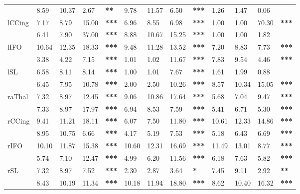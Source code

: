 \begin{tabular}{lllll|llll|llll}
\rowcolor[HTML]{C0C0C0}
\multicolumn{1}{l|}{\cellcolor[HTML]{C0C0C0}lArc} & 8.59 & 10.37 & 2.67 & \textbf{**} & 9.78 & 11.57 & 6.50 & \textbf{***} & 1.26 & 1.47 & 0.06 & \textbf{} \\
\multicolumn{1}{l|}{lCCing} & 7.17 & 8.79 & 15.00 & \textbf{***} & 6.96 & 8.55 & 6.98 & \textbf{***} & 1.00 & 1.00 & 70.30 & \textbf{***} \\
\rowcolor[HTML]{C0C0C0}
\multicolumn{1}{l|}{\cellcolor[HTML]{C0C0C0}lCS} & 6.41 & 7.90 & 37.00 & \textbf{***} & 8.88 & 10.67 & 15.25 & \textbf{***} & 1.00 & 1.00 & 1.82 & \textbf{} \\
\multicolumn{1}{l|}{lIFO} & 10.64 & 12.35 & 18.33 & \textbf{***} & 9.48 & 11.28 & 13.52 & \textbf{***} & 7.20 & 8.83 & 7.73 & \textbf{***} \\
\rowcolor[HTML]{C0C0C0}
\multicolumn{1}{l|}{\cellcolor[HTML]{C0C0C0}lIL} & 3.38 & 4.22 & 7.15 & \textbf{***} & 1.01 & 1.02 & 11.67 & \textbf{***} & 7.83 & 9.54 & 4.46 & \textbf{***} \\
\multicolumn{1}{l|}{lSL} & 6.58 & 8.11 & 8.14 & \textbf{***} & 1.00 & 1.01 & 7.67 & \textbf{***} & 1.61 & 1.99 & 0.88 & \textbf{} \\
\rowcolor[HTML]{C0C0C0}
\multicolumn{1}{l|}{\cellcolor[HTML]{C0C0C0}lUnc} & 6.45 & 7.95 & 10.78 & \textbf{***} & 2.00 & 2.50 & 10.26 & \textbf{***} & 8.57 & 10.34 & 15.05 & \textbf{***} \\
\multicolumn{1}{l|}{raThal} & 7.32 & 8.97 & 12.45 & \textbf{***} & 9.06 & 10.86 & 17.64 & \textbf{***} & 5.68 & 7.04 & 9.47 & \textbf{***} \\
\rowcolor[HTML]{C0C0C0}
\multicolumn{1}{l|}{\cellcolor[HTML]{C0C0C0}rArc} & 7.33 & 8.97 & 17.97 & \textbf{***} & 6.94 & 8.53 & 7.59 & \textbf{***} & 5.41 & 6.71 & 5.30 & \textbf{***} \\
\multicolumn{1}{l|}{rCCing} & 9.41 & 11.21 & 18.11 & \textbf{***} & 6.07 & 7.50 & 11.80 & \textbf{***} & 10.61 & 12.33 & 14.86 & \textbf{***} \\
\rowcolor[HTML]{C0C0C0}
\multicolumn{1}{l|}{\cellcolor[HTML]{C0C0C0}rCS} & 8.95 & 10.75 & 6.66 & \textbf{***} & 4.17 & 5.19 & 7.53 & \textbf{***} & 5.18 & 6.43 & 6.69 & \textbf{***} \\
\multicolumn{1}{l|}{rIFO} & 10.10 & 11.87 & 15.38 & \textbf{***} & 10.60 & 12.31 & 16.69 & \textbf{***} & 11.49 & 13.01 & 8.77 & \textbf{***} \\
\rowcolor[HTML]{C0C0C0}
\multicolumn{1}{l|}{\cellcolor[HTML]{C0C0C0}rIL} & 5.74 & 7.10 & 12.47 & \textbf{***} & 4.99 & 6.20 & 11.56 & \textbf{***} & 6.18 & 7.63 & 5.82 & \textbf{***} \\
\multicolumn{1}{l|}{rSL} & 7.32 & 8.97 & 7.52 & \textbf{***} & 2.30 & 2.87 & 3.64 & \textbf{*} & 7.45 & 9.11 & 2.92 & \textbf{**} \\
\rowcolor[HTML]{C0C0C0}
\multicolumn{1}{l|}{\cellcolor[HTML]{C0C0C0}rUnc} & 8.43 & 10.19 & 11.34 & \textbf{***} & 10.18 & 11.94 & 18.80 & \textbf{***} & 8.62 & 10.40 & 16.32 & \textbf{***}
\end{tabular}
